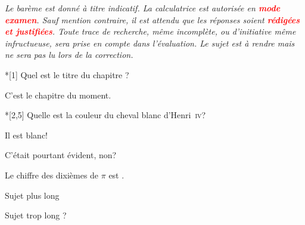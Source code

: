 \documentclass[
    Ramasse,
    Correction
]{PrRJeval}
\begin{document}
{
    \itshape\noindent
    Le barème est donné à titre indicatif. La calculatrice est autorisée en \textbf{\textcolor{red}{mode examen}}. Sauf mention contraire, il est attendu que les réponses soient \textbf{\textcolor{red}{rédigées et justifiées}}. Toute trace de recherche, même incomplète, ou d'initiative même infructueuse, sera prise en compte dans l'évaluation. Le sujet est à rendre mais ne sera pas lu lors de la correction.\bigskip
}

\begin{cours}*[1]
    Quel est le titre du chapitre ?

    \begin{Correction}
        C'est le chapitre du moment.
    \end{Correction}
\end{cours}

\begin{exercice}*[2,5]
    Quelle est la couleur du cheval blanc d'Henri~\textsc{iv}?

    \begin{Correction}
        Il est blanc! 

        C'était pourtant évident, non?
    \end{Correction}
\end{exercice}

\begin{exercice}
    Le chiffre des dixièmes de $\pi$ est .
\end{exercice}

\newpage

Sujet plus long

\newpage

Sujet trop long ?
\end{document}
